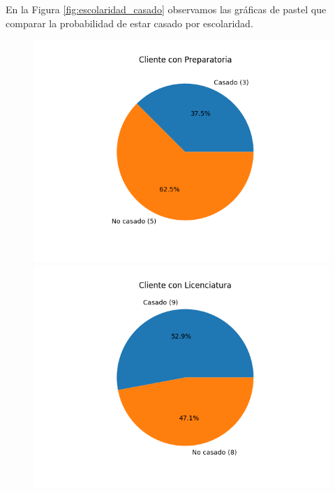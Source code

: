 \documentclass{article}
\begin{document}
En la Figura \ref{fig:escolaridad_casado} observamos las gráficas de pastel que comparar la probabilidad de estar casado por escolaridad.
\begin{figure}[h]
    \centering
    \begin{minipage}{0.3\textwidth}
        \centering
        \includegraphics[width=\textwidth]{figures/r1-Preparatoria-casado.png}
    \end{minipage}
    \hfill
    \begin{minipage}{0.3\textwidth}
        \centering
        \includegraphics[width=\textwidth]{figures/r1-Licenciatura-casado.png}
    \end{minipage}
    \hfill
    \begin{minipage}{0.3\textwidth}

\end{minipage}
\end{figure}
\end{document}
